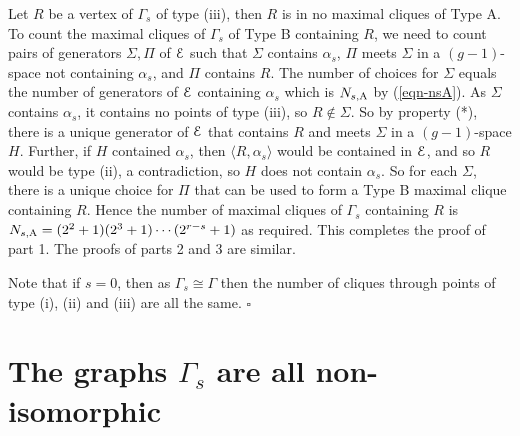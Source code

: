 \documentclass[12pt]{article}
\newenvironment{proof}{\noindent{\bf Proof}\hspace{0.5em}}
    { \null  \hfill $\square$ \par}
\newcommand\E{{\cal E}}
\newcommand{\Label}{\label}
\newcommand\red[1]{{\color{red} #1}}
\begin{document}
\begin{proof}
Let $R$ be   a vertex of $\Gamma_s$ of type (iii), then $R$ is in no maximal cliques of Type A. To count the maximal cliques of $\Gamma_s$ of Type B containing $R$, we  need to count pairs of generators $\Sigma,\Pi$ of $\E$ such that $\Sigma$ contains $\alpha_s$, $\Pi$ meets $\Sigma$ in a $(g-1)$-space not containing $\alpha_s$, and $\Pi$ contains $R$. The number of choices for $\Sigma$ equals the number of generators of $\E$ containing $\alpha_s$ which is $N_{s,{\rm A}}$ by (\ref{eqn-nsA}).  As $\Sigma$ contains $\alpha_s$, it contains no points of type (iii), so $R\notin\Sigma$. So by  property (*), there is a unique generator of $\E$ that contains $R$ and meets $\Sigma$ in a $(g-1)$-space $H$. Further, if $H$ contained $\alpha_s$, then $\langle R,\alpha_s\rangle$ would be contained in $\E$, and so $R$ would be type (ii), a contradiction, so $H$ does not contain $\alpha_s$. So for each $\Sigma$, there is a unique choice for $\Pi$ that can be used to form a Type B maximal clique containing $R$. Hence the number of maximal cliques of $\Gamma_s$ containing $R$ is $N_{s,{\rm A}}=(2^2+1)(2^3+1)\cdots(2^{r-s}+1)$ as required.  This completes the proof of part 1. The proofs of parts 2 and 3 are  similar.

\red{Note that if $s=0$, then as $\Gamma_s\cong\Gamma$ then the number of cliques through points of type (i), (ii) and (iii) are all the same.}
 \end{proof}

\section{The graphs $\Gamma_s$ are all  non-isomorphic}\Label{sec-new}
\end{document}
